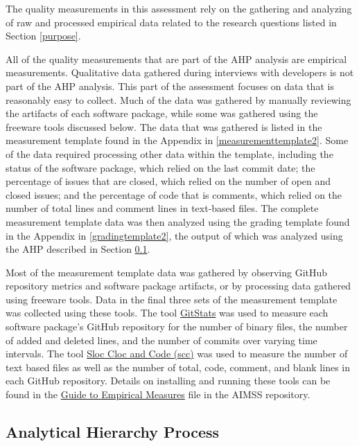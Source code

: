 \documentclass[12pt, notitlepage]{article}
\begin{document}
The quality measurements in this assessment rely on the gathering and analyzing of raw and processed empirical data related to the research questions listed in Section \ref{purpose}. 

All of the quality measurements that are part of the AHP analysis are empirical measurements. Qualitative data gathered during interviews with developers is not part of the AHP analysis. This part of the assessment focuses on data that is reasonably easy to collect. Much of the data was gathered by manually reviewing the artifacts of each software package, while some was gathered using the freeware tools discussed below. The data that was gathered is listed in the measurement template found in the Appendix in \ref{measurementtemplate2}. Some of the data required processing other data within the template, including the status of the software package, which relied on the last commit date; the percentage of issues that are closed, which relied on the number of open and closed issues; and the percentage of code that is comments, which relied on the number of total lines and comment lines in text-based files. The complete measurement template data was then analyzed using the grading template found in the Appendix in \ref{gradingtemplate2}, the output of which was analyzed using the AHP described in Section \ref{AHP}.

Most of the measurement template data was gathered by observing GitHub repository metrics and software package artifacts, or by processing data gathered using freeware tools. Data in the final three sets of the measurement template was collected using these tools. The tool \href{https://github.com/tomgi/git_stats}{GitStats} was used to measure each software package's GitHub repository for the number of binary files, the number of added and deleted lines, and the number of commits over varying time intervals. The tool \href{https://github.com/boyter/scc}{Sloc Cloc and Code (scc)} was used to measure the number of text based files as well as the number of total, code, comment, and blank lines in each GitHub repository. Details on installing and running these tools can be found in the \href{https://github.com/smiths/AIMSS/blob/master/StateOfPractice/Methodology/A
	Guide to Empirical Measures.pdf} {Guide to Empirical Measures} file in the AIMSS repository. 

\subsection{Analytical Hierarchy Process}\label{AHP}
\end{document}
